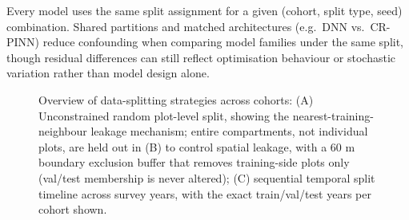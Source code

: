 \documentclass[11pt,a4paper]{report}
\begin{document}
Every model uses the same split assignment for a given (cohort, split type, seed) combination. Shared partitions and matched architectures (e.g.\ DNN vs.\ CR-PINN) reduce confounding when comparing model families under the same split, though residual differences can still reflect optimisation behaviour or stochastic variation rather than model design alone.

\begin{figure}[!htbp]
\centering
\begin{minipage}[b]{0.32\textwidth}
  \centering
\end{minipage}\hfill
\begin{minipage}[b]{0.32\textwidth}
  \centering
\end{minipage}\hfill
\begin{minipage}[b]{0.32\textwidth}
  \centering
\end{minipage}
\caption{Overview of data-splitting strategies across cohorts: (A) Unconstrained random plot-level
split, showing the nearest-training-neighbour leakage mechanism; entire compartments, not
individual plots, are held out in (B) to control spatial leakage, with a $60\text{~m}$ boundary
exclusion buffer that removes training-side plots only (val/test membership is never altered); (C)
sequential temporal split timeline across survey years, with the exact train/val/test years per
cohort shown.}
\label{fig:splits-combined}
\end{figure}
\end{document}
